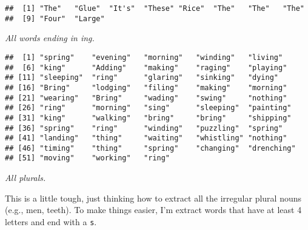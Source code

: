 \documentclass[]{article}
\newenvironment{Shaded}{\begin{snugshade}}{\end{snugshade}}
\newcommand{\KeywordTok}[1]{\textcolor[rgb]{0.13,0.29,0.53}{\textbf{#1}}}
\newcommand{\DecValTok}[1]{\textcolor[rgb]{0.00,0.00,0.81}{#1}}
\newcommand{\CharTok}[1]{\textcolor[rgb]{0.31,0.60,0.02}{#1}}
\newcommand{\StringTok}[1]{\textcolor[rgb]{0.31,0.60,0.02}{#1}}
\newcommand{\OperatorTok}[1]{\textcolor[rgb]{0.81,0.36,0.00}{\textbf{#1}}}
\newcommand{\NormalTok}[1]{#1}
\theoremstyle{definition}
\theoremstyle{definition}
\theoremstyle{definition}
\theoremstyle{remark}
\begin{document}
\begin{verbatim}
##  [1] "The"   "Glue"  "It's"  "These" "Rice"  "The"   "The"   "The"  
##  [9] "Four"  "Large"
\end{verbatim}

\emph{All words ending in ing.}

\begin{Shaded}
\end{Shaded}

\begin{verbatim}
##  [1] "spring"    "evening"   "morning"   "winding"   "living"   
##  [6] "king"      "Adding"    "making"    "raging"    "playing"  
## [11] "sleeping"  "ring"      "glaring"   "sinking"   "dying"    
## [16] "Bring"     "lodging"   "filing"    "making"    "morning"  
## [21] "wearing"   "Bring"     "wading"    "swing"     "nothing"  
## [26] "ring"      "morning"   "sing"      "sleeping"  "painting" 
## [31] "king"      "walking"   "bring"     "bring"     "shipping" 
## [36] "spring"    "ring"      "winding"   "puzzling"  "spring"   
## [41] "landing"   "thing"     "waiting"   "whistling" "nothing"  
## [46] "timing"    "thing"     "spring"    "changing"  "drenching"
## [51] "moving"    "working"   "ring"
\end{verbatim}

\emph{All plurals.}

This is a little tough, just thinking how to extract all the irregular
plural nouns (e.g., men, teeth). To make things easier, I'm extract
words that have at least 4 letters and end with a \texttt{s}.

\begin{Shaded}
\end{Shaded}
\end{document}
